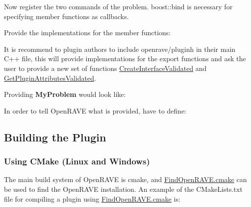 Now register the two commands of the problem. {\ttfamily boost::bind} is necessary for specifying member functions as callbacks.


\begin{DoxyCodeInclude}

\end{DoxyCodeInclude}


Provide the implementations for the member functions: 
\begin{DoxyCodeInclude}

\end{DoxyCodeInclude}


It is recommend to plugin authors to include openrave/pluginh in their main C++ file, this will provide implementations for the export functions and ask the user to provide a new set of functions \hyperlink{group__plugin__exports_ga468c900067e08689383b3f8da642141f}{CreateInterfaceValidated} and \hyperlink{group__plugin__exports_gaf90c03438b94cc76e7b8a54d445ec106}{GetPluginAttributesValidated}.

Providing {\bfseries MyProblem} would look like:


\begin{DoxyCodeInclude}

\end{DoxyCodeInclude}


In order to tell OpenRAVE what is provided, have to define:


\begin{DoxyCodeInclude}

\end{DoxyCodeInclude}
\hypertarget{writing__plugins_writing_plugins_build}{}\subsection{Building the Plugin}\label{writing__plugins_writing_plugins_build}
\hypertarget{writing__plugins_writing_plugins_cmake}{}\subsubsection{Using CMake (Linux and Windows)}\label{writing__plugins_writing_plugins_cmake}
The main build system of OpenRAVE is cmake, and \hyperlink{FindOpenRAVE.cmake-example}{FindOpenRAVE.cmake} can be used to find the OpenRAVE installation. An example of the {\ttfamily CMakeLists.txt} file for compiling a plugin using \hyperlink{FindOpenRAVE.cmake-example}{FindOpenRAVE.cmake} is:

